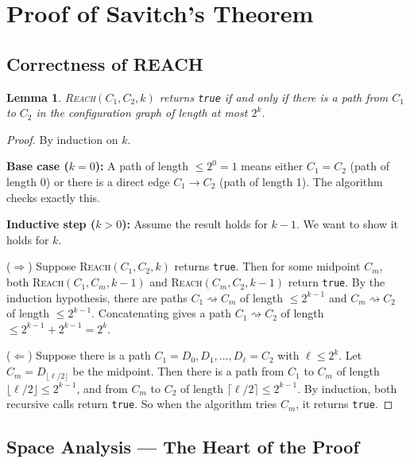 \documentclass[12pt,a4paper]{article}
\theoremstyle{plain}
\newtheorem{lemma}[theorem]{Lemma}
\theoremstyle{definition}
\theoremstyle{remark}
\begin{document}
\section{Proof of Savitch's Theorem}

\subsection{Correctness of REACH}

\begin{lemma}\label{lem:correct}
\textsc{Reach}$(C_1, C_2, k)$ returns \texttt{true} if and only if there is a path from $C_1$ to $C_2$ in the configuration graph of length at most $2^k$.
\end{lemma}

\begin{proof}
By induction on $k$.

\textbf{Base case ($k = 0$):} A path of length $\leq 2^0 = 1$ means either $C_1 = C_2$ (path of length 0) or there is a direct edge $C_1 \to C_2$ (path of length 1). The algorithm checks exactly this.

\textbf{Inductive step ($k > 0$):} Assume the result holds for $k - 1$. We want to show it holds for $k$.

($\Rightarrow$) Suppose \textsc{Reach}$(C_1, C_2, k)$ returns \texttt{true}. Then for some midpoint $C_m$, both \textsc{Reach}$(C_1, C_m, k-1)$ and \textsc{Reach}$(C_m, C_2, k-1)$ return \texttt{true}. By the induction hypothesis, there are paths $C_1 \rightsquigarrow C_m$ of length $\leq 2^{k-1}$ and $C_m \rightsquigarrow C_2$ of length $\leq 2^{k-1}$. Concatenating gives a path $C_1 \rightsquigarrow C_2$ of length $\leq 2^{k-1} + 2^{k-1} = 2^k$.

($\Leftarrow$) Suppose there is a path $C_1 = D_0, D_1, \ldots, D_\ell = C_2$ with $\ell \leq 2^k$. Let $C_m = D_{\lfloor \ell/2 \rfloor}$ be the midpoint. Then there is a path from $C_1$ to $C_m$ of length $\lfloor \ell/2 \rfloor \leq 2^{k-1}$, and from $C_m$ to $C_2$ of length $\lceil \ell/2 \rceil \leq 2^{k-1}$. By induction, both recursive calls return \texttt{true}. So when the algorithm tries $C_m$, it returns \texttt{true}.
\end{proof}

\subsection{Space Analysis — The Heart of the Proof}
\end{document}

